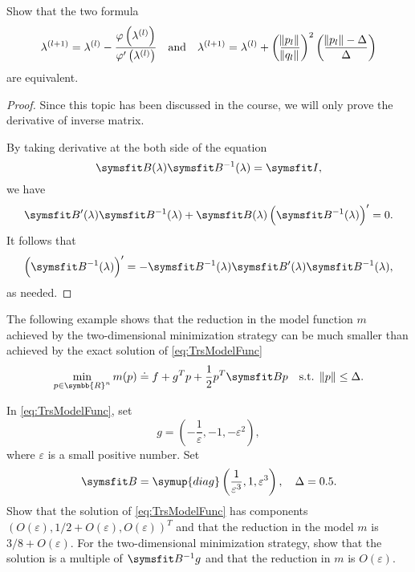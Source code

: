 \documentclass{assignment}[2019/10/15]
\newcommand{\BR}{\symbb{R}}
\newcommand{\diag}{\mathop{}\!\symup{diag}}
\newcommand{\B}{\matr{B}}
\newcommand{\Bi}{\matr{B}^{-1}}
\begin{document}
    \begin{problem}
        Show that the two formula
        \begin{equation}
            \lambda^{(l+1)}=\lambda^{(l)}-\frac{\varphi\left(\lambda^{(l)}\right)}{\varphi'\left(\lambda^{(l)}\right)}
            \quad\text{and}\quad
            \lambda^{(l+1)}=\lambda^{(l)}+\left(\frac{\norm{p_l}}{\norm{q_l}}\right)^2\left(\frac{\norm{p_l}-\Delta}{\Delta}\right)
        \end{equation}
        are equivalent.
    \end{problem}
    \begin{proof}
        Since this topic has been discussed in the course, we will only prove the derivative of inverse matrix.

        By taking derivative at the both side of the equation
        \begin{equation}
            \B(\lambda)\Bi(\lambda)=\matr{I},
        \end{equation}
        we have
        \begin{equation}
            \B'(\lambda)\Bi(\lambda)+\B(\lambda)\left(\Bi(\lambda)\right)'=0.
        \end{equation}
        It follows that
        \begin{equation}
            \left(\Bi(\lambda)\right)'=-\Bi(\lambda)\B'(\lambda)\Bi(\lambda),
        \end{equation}
        as needed.
    \end{proof}
    \begin{problem}
        The following example shows that the reduction in the model function $m$ achieved by the two-dimensional minimization strategy can be much smaller than achieved by the exact solution of \ref{eq:TrsModelFunc}
        \begin{equation}\label{eq:TrsModelFunc}
            \min_{p\in\BR^n}m(p)\doteq f+g^Tp+\frac{1}{2}p^T\B p\quad\text{s.t. }\norm{p}\leq\Delta.
        \end{equation}

        In \ref{eq:TrsModelFunc}, set
        \begin{equation}
            g = \left(-\frac{1}{\varepsilon}, -1, -\varepsilon^2\right),
        \end{equation}
        where $\varepsilon$ is a small positive number. Set
        \begin{equation}
            \B = \diag\left(\frac{1}{\varepsilon^3}, 1, \varepsilon^3\right),\quad \Delta=0.5.
        \end{equation}
        Show that the solution of \ref{eq:TrsModelFunc} has components $\left(O(\varepsilon), 1/2+O(\varepsilon), O(\varepsilon)\right)^T$ and that the reduction in the model $m$ is $3/8 + O(\varepsilon)$. For the two-dimensional minimization strategy, show that the solution is a multiple of $\Bi g$ and that the reduction in $m$ is $O(\varepsilon)$.
    \end{problem}
\end{document}

